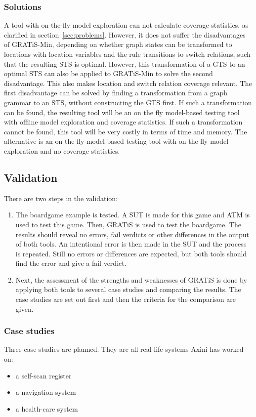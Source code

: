 \subsubsection{Solutions}
A tool with on-the-fly model exploration can not calculate coverage statistics, as clarified in section~\ref{sec:problems}. However, it does not suffer the disadvantages of GRATiS-Min, depending on whether graph states can be transformed to locations with location variables and the rule transitions to switch relations, such that the resulting STS is optimal. However, this transformation of a GTS to an optimal STS can also be applied to GRATiS-Min to solve the second disadvantage. This also makes location and switch relation coverage relevant. The first disadvantage can be solved by finding a transformation from a graph grammar to an STS, without constructing the GTS first. If such a transformation can be found, the resulting tool will be an on the fly model-based testing tool with offline model exploration and coverage statistics. If such a transformation cannot be found, this tool will be very costly in terms of time and memory. The alternative is an on the fly model-based testing tool with on the fly model exploration and no coverage statistics.

\subsection{Validation}\label{sec:research_methods_validation}
There are two steps in the validation:
\begin{enumerate}
  \item The boardgame example is tested. A SUT is made for this game and ATM is used to test this game. Then, GRATiS is used to test the boardgame. The results should reveal no errors, fail verdicts or other differences in the output of both tools. An intentional error is then made in the SUT and the process is repeated. Still no errors or differences are expected, but both tools should find the error and give a fail verdict.
  \item Next, the assessment of the strengths and weaknesses of GRATiS is done by applying both tools to several case studies and comparing the results. The case studies are set out first and then the criteria for the comparison are given.
\end{enumerate}

\subsubsection{Case studies}
Three case studies are planned. They are all real-life systems Axini has worked on:
\begin{itemize}
  \item a self-scan register
  \item a navigation system
  \item a health-care system
\end{itemize}  

